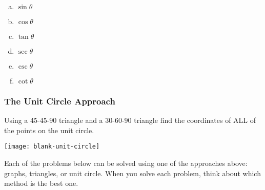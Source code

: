 \documentclass[11pt,fleqn]{article}
\begin{document}
\vskip1in

  \begin{multicols}{6}{
      \vspace*{-0.45in}
      \begin{enumerate}[a)]
      \item $\sin \theta$
      \item $\cos \theta$
      \item $\tan \theta$
      \item $\sec \theta$
      \item $\csc \theta$
      \item $\cot \theta$
      \end{enumerate}}
  \end{multicols}

\vskip2in
\subsubsection*{The Unit Circle Approach}

Using a 45-45-90 triangle and a 30-60-90 triangle
find the coordinates of ALL of the points on the unit circle.
\begin{flushleft}
  \texttt{[image: blank-unit-circle]}
\end{flushleft}

\newpage
Each of the problems below can be solved using one of the approaches above: graphs, triangles, or unit circle. When you solve each problem, think about which method is the best one.\\
\end{document}

